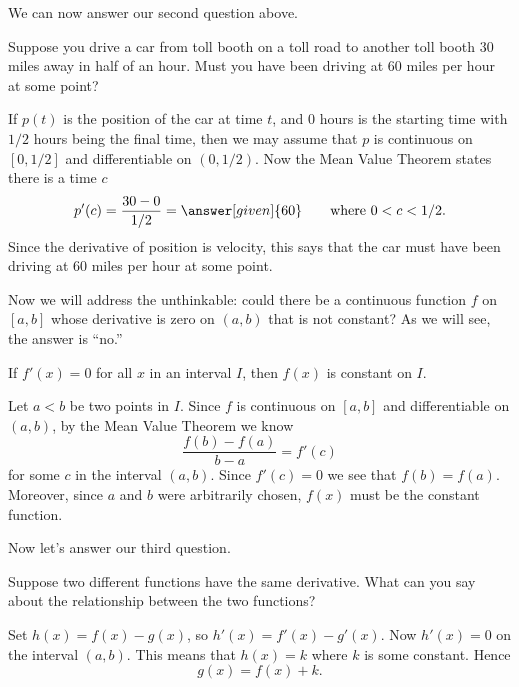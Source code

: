 \documentclass{ximera}
\begin{document}
We can now answer our second question above.  

\begin{example}
Suppose you drive a car from toll booth on a toll road to another toll
booth $30$ miles away in half of an hour. Must you have been driving
at $60$ miles per hour at some point?

\begin{explanation}
If $p(t)$ is the position of the car at time $t$, and $0$ hours is the
starting time with $1/2$ hours being the final time, then we may
assume that $p$ is continuous on $[0,1/2]$ and differentiable on
$(0,1/2)$. Now the Mean Value Theorem states there is a time $c$
\[
p'(c) = \frac{30-0}{1/2} = \answer[given]{60}\qquad \text{where $0<c<1/2$.}
\]
Since the derivative of position is velocity, this says that the car
must have been driving at $60$ miles per hour at some point.
\end{explanation}
\end{example}

Now we will address the unthinkable: could there be a continuous
function $f$ on $[a,b]$ whose derivative is zero on $(a,b)$ that is
not constant? As we will see, the answer is ``no.''

\begin{theorem} 
If $f'(x)=0$ for all $x$ in an interval $I$, then $f(x)$ is constant
on $I$.
\begin{explanation}
Let $a< b$ be two points in $I$. Since $f$ is continuous on $[a,b]$
and differentiable on $(a,b)$, by the Mean Value Theorem we know
\[
\frac{f(b)-f(a)}{b-a} = f'(c)
\]
for some $c$ in the interval $(a,b)$. Since $f'(c)=0$ we see that
$f(b)=f(a)$. %
Moreover, since $a$ and $b$ were arbitrarily chosen,
$f(x)$ must be the constant function.
\end{explanation}
\end{theorem}


Now let's answer our third question.

\begin{example}
Suppose two different functions have the same derivative. What can you
say about the relationship between the two functions?

\begin{explanation}
Set $h(x) = f(x) - g(x)$, so $h'(x) = f'(x) -g'(x)$. Now $h'(x) = 0$
on the interval $(a,b)$. This means that $h(x) = k$ where $k$ is some
constant. Hence
\[
g(x) = f(x) + k.
\]
\end{explanation}
\end{example}
\end{document}
